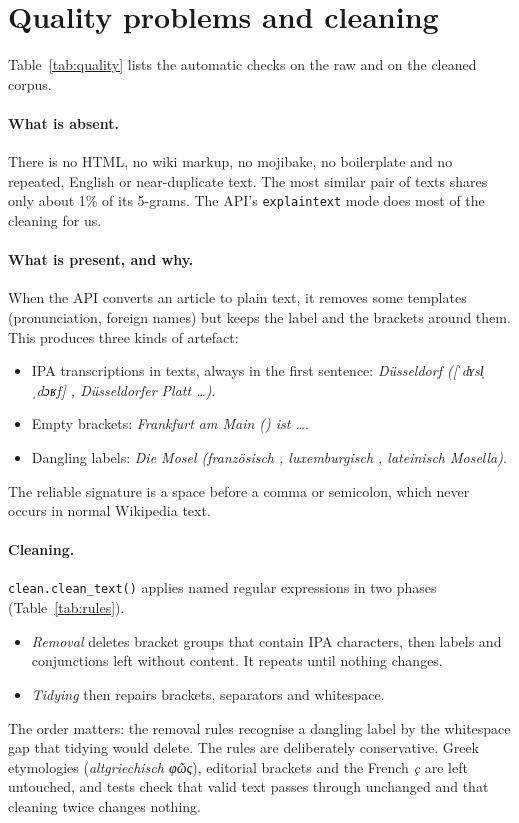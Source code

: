 \documentclass[11pt,a4paper]{article}
\newcommand{\code}[1]{\texttt{#1}}
\newcommand{\de}[1]{\textit{#1}}
\begin{document}
\section{Quality problems and cleaning}\label{sec:quality}

Table~\ref{tab:quality} lists the automatic checks on the raw and on the cleaned corpus.

\begin{table}[h]\centering\small
\caption{Automatic quality checks, raw vs.\ cleaned corpus.}\label{tab:quality}

\end{table}

\paragraph{What is absent.} There is no HTML, no wiki markup, no mojibake, no boilerplate and no repeated, English or near-duplicate text. The most similar pair of texts shares only about 1\% of its 5-grams. The API's \code{explaintext} mode does most of the cleaning for us.

\paragraph{What is present, and why.} When the API converts an article to plain text, it removes some templates (pronunciation, foreign names) but keeps the label and the brackets around them. This produces three kinds of artefact:
\begin{itemize}
  \item IPA transcriptions in \NIPAFiles{} texts, always in the first sentence: \de{Düsseldorf ([ˈdʏsl̩ˌdɔʁf] , Düsseldorfer Platt …)}.
  \item Empty brackets: \de{Frankfurt am Main () ist …}.
  \item Dangling labels: \de{Die Mosel (französisch , luxemburgisch , lateinisch Mosella)}.
\end{itemize}
The reliable signature is a space before a comma or semicolon, which never occurs in normal Wikipedia text.

\paragraph{Cleaning.} \code{clean.clean\_text()} applies named regular expressions in two phases (Table~\ref{tab:rules}).
\begin{itemize}
  \item \emph{Removal} deletes bracket groups that contain IPA characters, then labels and conjunctions left without content. It repeats until nothing changes.
  \item \emph{Tidying} then repairs brackets, separators and whitespace.
\end{itemize}
The order matters: the removal rules recognise a dangling label by the whitespace gap that tidying would delete. The rules are deliberately conservative. Greek etymologies (\de{altgriechisch φῶς}), editorial brackets and the French \de{ç} are left untouched, and tests check that valid text passes through unchanged and that cleaning twice changes nothing.
\end{document}
